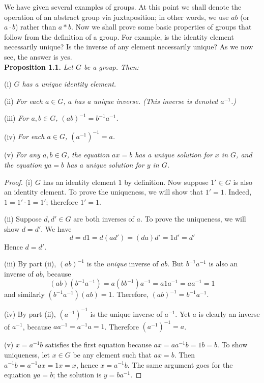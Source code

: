 \documentclass[leqno]{book}
\begin{document}
\noindent We have given several examples of groups.  At this point we shall denote the operation of an abstract group via juxtaposition; in other words, we use $ab$ (or $a\cdot b$) rather than $a*b$.  Now we shall prove some basic properties of groups that follow from the definition of a group.  For example, is the identity element necessarily unique?  Is the inverse of any element necessarily unique?  As we now see, the answer is yes.\\

\noindent\textbf{Proposition 1.1.} \emph{Let $G$ be a group.  Then:} %

(i) \emph{$G$ has a unique identity element.}

(ii) \emph{For each $a\in G$, $a$ has a unique inverse.  (This inverse is denoted $a^{-1}$.)}

(iii) \emph{For $a,b\in G$, $(ab)^{-1}=b^{-1}a^{-1}$.}

(iv) \emph{For each $a\in G$, $(a^{-1})^{-1}=a$.}

(v) \emph{For any $a,b\in G$, the equation $ax=b$ has a unique solution for $x$ in $G$, and the equation $ya=b$ has a unique solution for $y$ in $G$.}

\begin{proof}
(i) $G$ has an identity element $1$ by definition.  Now suppose $1'\in G$ is also an identity element.  To prove the uniqueness, we will show that $1'=1$.  Indeed, $1=1'\cdot 1=1'$; therefore $1'=1$.

(ii) Suppose $d,d'\in G$ are both inverses of $a$.  To prove the uniqueness, we will show $d=d'$.  We have
$$d=d1=d(ad')=(da)d'=1d'=d'$$
Hence $d=d'$.

(iii) By part (ii), $(ab)^{-1}$ is the \emph{unique} inverse of $ab$.  But $b^{-1}a^{-1}$ is also an inverse of $ab$, because
$$(ab)(b^{-1}a^{-1})=a(bb^{-1})a^{-1}=a1a^{-1}=aa^{-1}=1$$
and similarly $(b^{-1}a^{-1})(ab)=1$.  Therefore, $(ab)^{-1}=b^{-1}a^{-1}$.

(iv) By part (ii), $(a^{-1})^{-1}$ is the unique inverse of $a^{-1}$.  Yet $a$ is clearly an inverse of $a^{-1}$, because $aa^{-1}=a^{-1}a=1$.  Therefore $(a^{-1})^{-1}=a$.

(v) $x=a^{-1}b$ satisfies the first equation because $ax=aa^{-1}b=1b=b$.  To show uniqueness, let $x\in G$ be any element such that $ax=b$.  Then $a^{-1}b=a^{-1}ax=1x=x$, hence $x=a^{-1}b$.  The same argument goes for the equation $ya=b$; the solution is $y=ba^{-1}$.
\end{proof}
\end{document}
